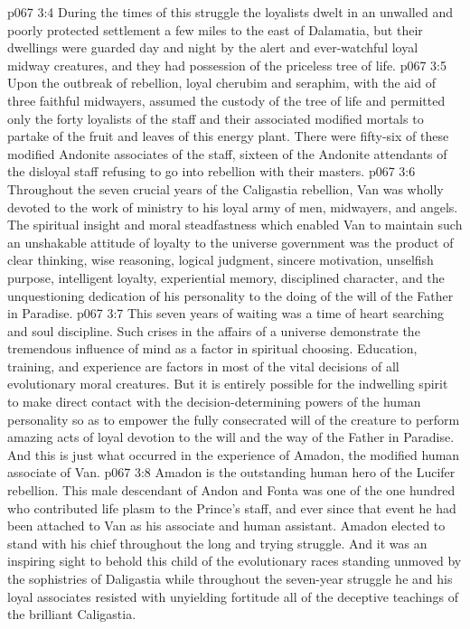 \vs p067 3:4 During the times of this struggle the loyalists dwelt in an unwalled and poorly protected settlement a few miles to the east of Dalamatia, but their dwellings were guarded day and night by the alert and ever\hyp{}watchful loyal midway creatures, and they had possession of the priceless tree of life.
\vs p067 3:5 Upon the outbreak of rebellion, loyal cherubim and seraphim, with the aid of three faithful midwayers, assumed the custody of the tree of life and permitted only the forty loyalists of the staff and their associated modified mortals to partake of the fruit and leaves of this energy plant. There were fifty\hyp{}six of these modified Andonite associates of the staff, sixteen of the Andonite attendants of the disloyal staff refusing to go into rebellion with their masters.
\pc \vs p067 3:6 Throughout the seven crucial years of the Caligastia rebellion, Van was wholly devoted to the work of ministry to his loyal army of men, midwayers, and angels. The spiritual insight and moral steadfastness which enabled Van to maintain such an unshakable attitude of loyalty to the universe government was the product of clear thinking, wise reasoning, logical judgment, sincere motivation, unselfish purpose, intelligent loyalty, experiential memory, disciplined character, and the unquestioning dedication of his personality to the doing of the will of the Father in Paradise.
\vs p067 3:7 This seven years of waiting was a time of heart searching and soul discipline. Such crises in the affairs of a universe demonstrate the tremendous influence of mind as a factor in spiritual choosing. Education, training, and experience are factors in most of the vital decisions of all evolutionary moral creatures. But it is entirely possible for the indwelling spirit to make direct contact with the decision\hyp{}determining powers of the human personality so as to empower the fully consecrated will of the creature to perform amazing acts of loyal devotion to the will and the way of the Father in Paradise. And this is just what occurred in the experience of Amadon, the modified human associate of Van.
\vs p067 3:8 Amadon is the outstanding human hero of the Lucifer rebellion. This male descendant of Andon and Fonta was one of the one hundred who contributed life plasm to the Prince’s staff, and ever since that event he had been attached to Van as his associate and human assistant. Amadon elected to stand with his chief throughout the long and trying struggle. And it was an inspiring sight to behold this child of the evolutionary races standing unmoved by the sophistries of Daligastia while throughout the seven\hyp{}year struggle he and his loyal associates resisted with unyielding fortitude all of the deceptive teachings of the brilliant Caligastia.
